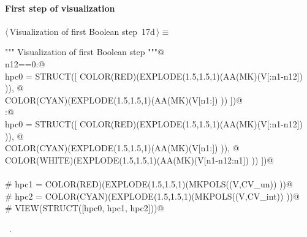 \documentclass[11pt,oneside]{article}	%
\begin{document}
\paragraph{First step of visualization}

\begin{flushleft} \small \label{scrap40}
\protect{}$\langle\,$Visualization of first Boolean step\nobreak\ {\footnotesize 17d}$\,\rangle\equiv$
\vspace{-1ex}
\begin{list}{}{} \item
\mbox{}\verb@""" Visualization of first Boolean step  """@\\
\mbox{}\verb@if n12==0:@\\
\mbox{}\verb@   hpc0 = STRUCT([ COLOR(RED)(EXPLODE(1.5,1.5,1)(AA(MK)(V[:n1-n12]) )), @\\
\mbox{}\verb@            COLOR(CYAN)(EXPLODE(1.5,1.5,1)(AA(MK)(V[n1:]) )) ])@\\
\mbox{}\verb@else:@\\
\mbox{}\verb@   hpc0 = STRUCT([ COLOR(RED)(EXPLODE(1.5,1.5,1)(AA(MK)(V[:n1-n12]) )), @\\
\mbox{}\verb@            COLOR(CYAN)(EXPLODE(1.5,1.5,1)(AA(MK)(V[n1:]) )), @\\
\mbox{}\verb@            COLOR(WHITE)(EXPLODE(1.5,1.5,1)(AA(MK)(V[n1-n12:n1]) )) ])@\\
\mbox{}\verb@@\\
\mbox{}\verb@# hpc1 = COLOR(RED)(EXPLODE(1.5,1.5,1)(MKPOLS((V,CV_un)) ))@\\
\mbox{}\verb@# hpc2 = COLOR(CYAN)(EXPLODE(1.5,1.5,1)(MKPOLS((V,CV_int)) ))@\\
\mbox{}\verb@# VIEW(STRUCT([hpc0, hpc1, hpc2]))@\\
\mbox{}\verb@@{\NWsep}
\end{list}
\vspace{-1ex}
\footnotesize\addtolength{\baselineskip}{-1ex}
\begin{list}{}{\setlength{\itemsep}{-\parsep}\setlength{\itemindent}{-\leftmargin}}
\item \NWtxtMacroRefIn\ .
\end{list}
\end{flushleft}
\end{document}
